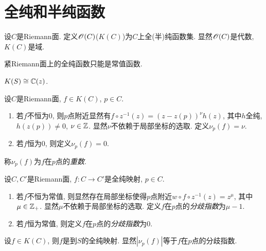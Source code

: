 \section{全纯和半纯函数}\label{s1-3}
\begin{definition}
    设$C$是Riemann面. 定义$\mathscr{O}(C)$($K(C)$)为$C$上全(半)纯函数集. 显然$\mathscr{O}(C)$是代数, $K(C)$是域. 
\end{definition}
\begin{theorem}
    紧Riemann面上的全纯函数只能是常值函数. 
\end{theorem}
\begin{theorem}
    $K(S)\cong\mathbb{C}(z)$. 
\end{theorem}
\begin{definition}
    设$C$是Riemann面, $f\in K(C)$, $p\in C$. 
    \begin{enumerate}
        \item 若$f$不恒为$0$, 则$p$点附近显然有$f\circ z^{-1}(z)=(z-z(p))^\nu h(z)$, 其中$h$全纯, $h(z(p))\neq0$, $\nu\in\mathbb{Z}$. 显然$\nu$不依赖于局部坐标的选取. 定义$\nu_p(f)=\nu$. 
        \item 若$f$恒为$0$, 则定义$\nu_p(f)=0$. 
    \end{enumerate}
    称$\nu_p(f)$为$f$在$p$点的\textit{重数}. 
\end{definition}
\begin{definition}
    设$C,C'$是Riemann面, $f:C\to C'$是全纯映射, $p\in C$. 
    \begin{enumerate}
        \item 若$f$不恒为常值, 则显然存在局部坐标使得$p$点附近$w\circ f\circ z^{-1}(z)=z^\mu$, 其中$\mu\in\mathbb{Z}_+$. 显然$\mu$不依赖于局部坐标的选取. 定义$f$在$p$点的\textit{分歧指数}为$\mu-1$. 
        \item 若$f$恒为常值, 则定义$f$在$p$点的\textit{分歧指数}为$0$. 
    \end{enumerate}
\end{definition}
\begin{remark}
    设$f\in K(C)$, 则$f$是到$S$的全纯映射. 显然$|\nu_p(f)|$等于$f$在$p$点的分歧指数. 
\end{remark}

